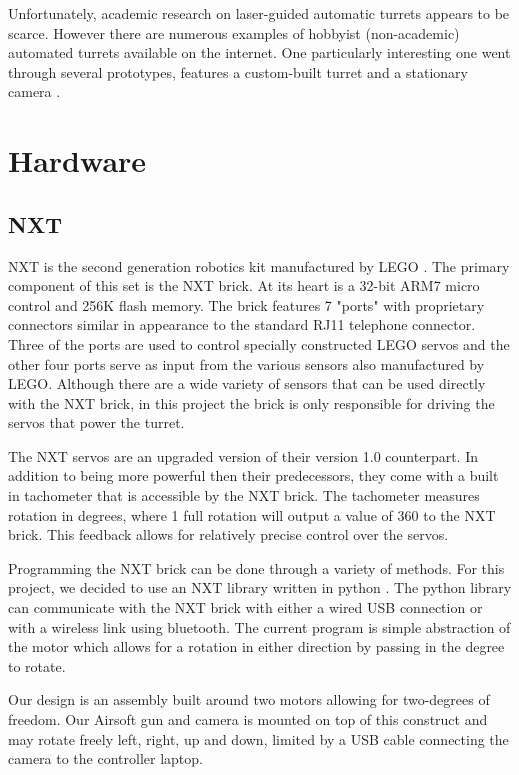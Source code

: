 \documentclass[10pt,twocolumn,letterpaper]{article}
\begin{document}
Unfortunately, academic research on laser-guided automatic turrets appears to be scarce.  However there are numerous examples of hobbyist (non-academic) automated turrets available on the internet.  One particularly interesting one went through several prototypes, features a custom-built turret and a stationary camera \cite{defcon}.

\section{Hardware}

\subsection{NXT}

NXT is the second generation robotics kit manufactured by LEGO \cite{nxt}. The primary component of this set is the NXT brick. At its heart is a 32-bit ARM7 micro control and 256K flash memory. The brick features 7 "ports" with proprietary connectors similar in appearance to the standard RJ11 telephone connector. Three of the ports are used to control specially constructed LEGO servos and the other four ports serve as input from the various sensors also manufactured by LEGO. Although there are a wide variety of sensors that can be used directly with the NXT brick, in this project the brick is only responsible for driving the servos that power the turret.

The NXT servos are an upgraded version of their version 1.0 counterpart. In addition to being more powerful then their predecessors, they come with a built in tachometer that is accessible by the NXT brick. The tachometer measures rotation in degrees, where 1 full rotation will output a value of 360 to the NXT brick. This feedback allows for relatively precise control over the servos.

Programming the NXT brick can be done through a variety of methods. For this project, we decided to use an NXT library written in python \cite{pynxt}. The python library can communicate with the NXT brick with either a wired USB connection or with a wireless link using bluetooth. The current program is simple abstraction of the motor which allows for a rotation in either direction by passing in the degree to rotate.

Our design is an assembly built around two motors allowing for two-degrees of freedom. Our Airsoft gun and camera is mounted on top of this construct and may rotate freely left, right, up and down, limited by a USB cable connecting the camera to the controller laptop.
 
\end{document}
